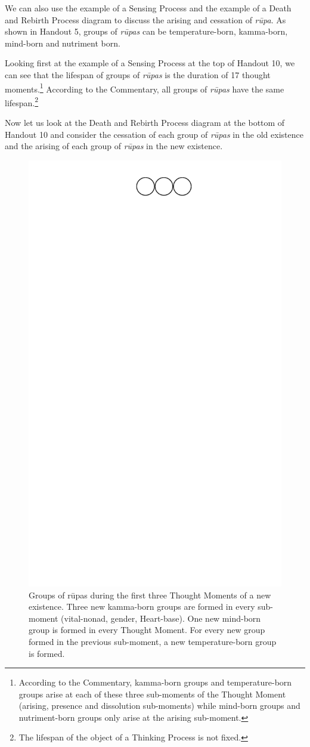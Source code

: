 We can also use the example of a Sensing Process and the example of a Death and Rebirth Process diagram to discuss the arising and cessation of \textit{rūpa}. As shown in Handout 5, groups of \textit{rūpas} can be temperature-born, kamma-born, mind-born and nutriment born.

Looking first at the example of a Sensing Process at the top of Handout 10, we can see that the lifespan of groups of \textit{rūpas} is the duration of 17 thought moments.\footnote{According to the Commentary, kamma-born groups and temperature-born groups arise at each of these three sub-moments of the Thought Moment (arising, presence and dissolution sub-moments) while mind-born groups and nutriment-born groups only arise at the arising sub-moment.} According to the Commentary, all groups of \textit{rūpas} have the same lifespan.\footnote{The lifespan of the object of a Thinking Process is not fixed.}

Now let us look at the Death and Rebirth Process diagram at the bottom of Handout 10 and consider the cessation of each group of \textit{rūpas} in the old existence and the arising of each group of \textit{rūpas} in the new existence. 

\begin{figure}[h]
\centering
\includegraphics[width=0.5\linewidth]{./Diagrams/NewRupa}
\caption{Groups of rūpas during the first three Thought Moments of a new existence. Three new kamma-born groups are formed in every sub-moment (vital-nonad, gender, Heart-base). One new mind-born group is formed in every Thought Moment. For every new group formed in the previous sub-moment, a new temperature-born group is formed.}
\label{fig:NewRupa}
\end{figure}

